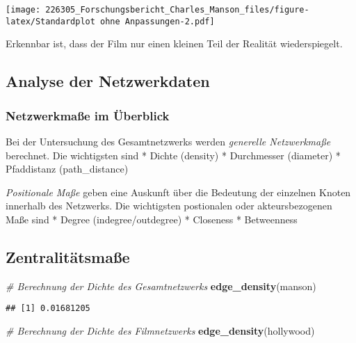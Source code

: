\documentclass[
]{article}
\newenvironment{Shaded}{\begin{snugshade}}{\end{snugshade}}
\newcommand{\CommentTok}[1]{\textcolor[rgb]{0.56,0.35,0.01}{\textit{#1}}}
\newcommand{\KeywordTok}[1]{\textcolor[rgb]{0.13,0.29,0.53}{\textbf{#1}}}
\newcommand{\NormalTok}[1]{#1}
\begin{document}
\texttt{[image: 226305\_Forschungsbericht\_Charles\_Manson\_files/figure-latex/Standardplot ohne Anpassungen-2.pdf]}

Erkennbar ist, dass der Film nur einen kleinen Teil der Realität
wiederspiegelt.

\hypertarget{analyse-der-netzwerkdaten}{%
\subsection{Analyse der Netzwerkdaten}\label{analyse-der-netzwerkdaten}}

\hypertarget{netzwerkmauxdfe-im-uxfcberblick}{%
\subsubsection{Netzwerkmaße im
Überblick}\label{netzwerkmauxdfe-im-uxfcberblick}}

Bei der Untersuchung des Gesamtnetzwerks werden \emph{generelle
Netzwerkmaße} berechnet. Die wichtigsten sind * Dichte (density) *
Durchmesser (diameter) * Pfaddistanz (path\_distance)

\emph{Positionale Maße} geben eine Auskunft über die Bedeutung der
einzelnen Knoten innerhalb des Netzwerks. Die wichtigsten postionalen
oder akteursbezogenen Maße sind * Degree (indegree/outdegree) *
Closeness * Betweenness

\hypertarget{zentralituxe4tsmauxdfe}{%
\subsection{Zentralitätsmaße}\label{zentralituxe4tsmauxdfe}}

\begin{Shaded}
\begin{Highlighting}[]
\CommentTok{# Berechnung der Dichte des Gesamtnetzwerks}
\KeywordTok{edge_density}\NormalTok{(manson)}
\end{Highlighting}
\end{Shaded}

\begin{verbatim}
## [1] 0.01681205
\end{verbatim}

\begin{Shaded}
\begin{Highlighting}[]
\CommentTok{# Berechnung der Dichte des Filmnetzwerks}
\KeywordTok{edge_density}\NormalTok{(hollywood)}
\end{Highlighting}
\end{Shaded}
\end{document}
